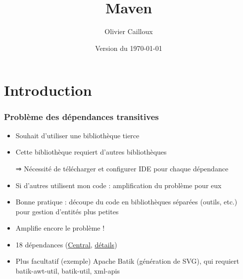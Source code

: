 \documentclass[english, french]{beamer}
\title{Maven}
\author{Olivier Cailloux}
\institute[LAMSADE]{LAMSADE, Université Paris-Dauphine}
\date{Version du \today}
\begin{document}


\begin{frame}[plain]
   \titlepage
\end{frame}
\addtocounter{framenumber}{-1}

\section{Introduction}
\begin{frame}
	\frametitle{Problème des dépendances transitives}
	\begin{itemize}
		\item Souhait d’utiliser une bibliothèque tierce
		\item Cette bibliothèque requiert d’autres bibliothèques
		\item[⇒] Nécessité de télécharger et configurer IDE pour chaque dépendance
		\item Si d’autres utilisent mon code : amplification du problème pour eux
		\item Bonne pratique : découpe du code en bibliothèques séparées (outils, etc.) pour gestion d’entités plus petites
		\item Amplifie encore le problème !
	\end{itemize}
	\begin{example}[JasperReports]
		\begin{itemize}
			\item 18 dépendances {\tiny (\href{http://search.maven.org/\#artifactdetails\%7Cnet.sf.jasperreports\%7Cjasperreports\%7C6.4.0\%7Cjar}{Central}, \href{https://mvnrepository.com/artifact/net.sf.jasperreports/jasperreports/6.4.0}{détails})}
			\item Plus facultatif (exemple) Apache Batik (génération de SVG), qui requiert batik-awt-util, batik-util, xml-apis
		\end{itemize}
	\end{example}
\end{frame}
\end{document}
